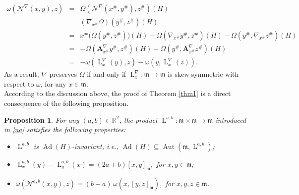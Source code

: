 \documentclass[preprint,12pt,1p]{elsarticle}
\theoremstyle{plain}
\newtheorem{proposition}[theorem]{Proposition}
\theoremstyle{definition}
\newcommand{\rel}{\mathbb{R}}
\newcommand{\n}{\nabla}
\newcommand{\w}{\omega}
\newcommand{\A}{\mathbf{A}}
\newcommand{\m}{\mathfrak{m}}
\newcommand{\Ad}{\operatorname{Ad}}
\newcommand{\Aut}{\operatorname{Aut}}
\newcommand{\lN}{\operatorname{L}^\n}
\numberwithin{equation}{section}
\newcommand{\lab}{\operatorname{L}^{a,b}}
\newcommand{\ab}{(a,b)}
\begin{document}
\begin{eqnarray}\label{NGinv}
\omega\left(\mathcal{N}^\n(x,y),z\right)&=&\Omega\left(\mathcal{N}^\n(x^\#,y^\#),z^\#\right)(H)\nonumber\\
&=&\left(\n_{x^\#}\Omega\right)(y^\#,z^\#)(H)\nonumber\\
&=&x^\#\Big(\Omega(y^\#,z^\#)\Big)(H)-\Omega\left(\n_{x^\#}y^\#,z^\#\right)(H)-\Omega\left(y^\#,\n_{x^\#}z^\#\right)(H)\nonumber\\
&=&-\Omega\left(\A^\n_{x^\#}y^\#,z^\#\right)(H)-\Omega\left(y^\#,\A^\n_{x^\#}z^\#\right)(H)\nonumber\\
&=&-\omega\left(\lN_x(y),z\right)-\omega\left(y,\lN_x(z)\right).
\end{eqnarray}
As a result, $\n$ preserves $\Omega$ if and only if $\lN_x:\m\to\m$ is skew-symmetric with respect to $\omega$, for any $x\in\m$.\\

According to the discussion above, the proof of Theorem \ref{thm1} is a direct consequence of the following proposition.

\begin{proposition}\label{PrpPrda}
For any $\ab\in\rel^2$, the product $\lab:\mathfrak{m}\times\mathfrak{m}\to\mathfrak{m}$ introduced in \eqref{na} satisfies the following properties:
\begin{itemize}
\item[$1.$] $\lab$ is $\Ad(H)$-invariant, i.e., $\Ad(H)\subseteq\Aut\left(\mathfrak{m},\lab\right)$;
\item[$2.$] $\lab_x(y)-\lab_y(x)=(2a+b)[x,y]_\mathfrak{m}$,\,  for $x,y\in\mathfrak{m}$;
\item[$3.$] $\omega\left(\mathcal{N}^{a,b}(x,y),z\right)=(b-a)\,\w(x,[y,z]_\m)$,\, for $x,y,z\in\m$.
\end{itemize}
\end{proposition}
\end{document}
